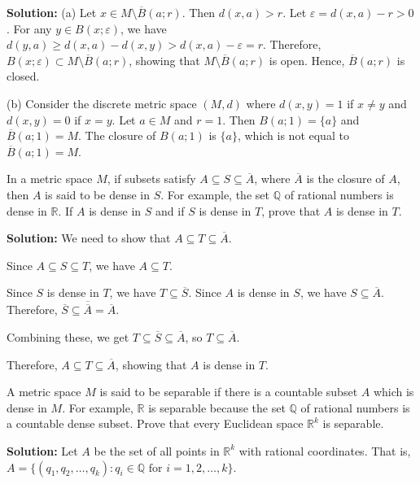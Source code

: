 \textbf{Solution:} 
(a) Let $x \in M \setminus \overline{B}(a;r)$. Then $d(x,a) > r$. Let $\varepsilon = d(x,a) - r > 0$. For any $y \in B(x;\varepsilon)$, we have $d(y,a) \geq d(x,a) - d(x,y) > d(x,a) - \varepsilon = r$. Therefore, $B(x;\varepsilon) \subset M \setminus \overline{B}(a;r)$, showing that $M \setminus \overline{B}(a;r)$ is open. Hence, $\overline{B}(a;r)$ is closed.

(b) Consider the discrete metric space $(M,d)$ where $d(x,y) = 1$ if $x \neq y$ and $d(x,y) = 0$ if $x = y$. Let $a \in M$ and $r = 1$. Then $B(a;1) = \{a\}$ and $\overline{B}(a;1) = M$. The closure of $B(a;1)$ is $\{a\}$, which is not equal to $\overline{B}(a;1) = M$.

\begin{problembox}
In a metric space \( M \), if subsets satisfy \( A \subseteq S \subseteq \overline{A} \), where \(\overline{A}\) is the closure of \( A \), then \( A \) is said to be dense in \( S \). For example, the set \( \mathbb{Q} \) of rational numbers is dense in \( \mathbb{R} \). If \( A \) is dense in \( S \) and if \( S \) is dense in \( T \), prove that \( A \) is dense in \( T \).
\end{problembox}

\textbf{Solution:} We need to show that $A \subseteq T \subseteq \overline{A}$.

Since $A \subseteq S \subseteq T$, we have $A \subseteq T$.

Since $S$ is dense in $T$, we have $T \subseteq \overline{S}$. Since $A$ is dense in $S$, we have $S \subseteq \overline{A}$. Therefore, $\overline{S} \subseteq \overline{\overline{A}} = \overline{A}$.

Combining these, we get $T \subseteq \overline{S} \subseteq \overline{A}$, so $T \subseteq \overline{A}$.

Therefore, $A \subseteq T \subseteq \overline{A}$, showing that $A$ is dense in $T$.

\begin{problembox}
A metric space \( M \) is said to be separable if there is a countable subset \( A \) which is dense in \( M \). For example, \( \mathbb{R} \) is separable because the set \( \mathbb{Q} \) of rational numbers is a countable dense subset. Prove that every Euclidean space \( \mathbb{R}^k \) is separable.
\end{problembox}

\textbf{Solution:} Let $A$ be the set of all points in $\mathbb{R}^k$ with rational coordinates. That is, $A = \{(q_1, q_2, \ldots, q_k) : q_i \in \mathbb{Q} \text{ for } i = 1,2,\ldots,k\}$.

